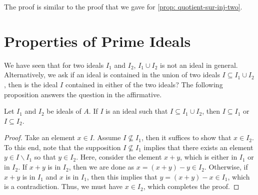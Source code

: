 The proof is similar to the proof that we gave for \eqref{prop: quotient-sur-inj-two}. 

\section{Properties of Prime Ideals}
We have seen that for two ideals $I_{1}$ and $I_{2}$, $I_{1} \cup I_{2}$ is not an ideal in general. Alternatively, we ask if an ideal is contained in the union of two ideals $I \subseteq I_{1} \cup I_{2}$, then is the ideal $I$ contained in either of the two ideals? The following proposition answers the question in the affirmative.
\begin{proposition}\label{prop: contained-two-some}
    Let $I_1$ and $I_2$ be ideals of $A$. If $I$ is an ideal such that $I \subseteq I_1 \cup I_2$, then $I \subseteq I_1$ or $I \subseteq I_2$.
\end{proposition}
\begin{proof}
    Take an element $x \in I$. Assume $I \nsubseteq I_1$, then it suffices to show that $x \in I_2$. To this end, note that the supposition $I \nsubseteq I_1$ implies that there exists an element $y \in I \backslash I_1$ so that $y \in I_2$. Here, consider the element $x+y$, which is either in $I_1$ or in $I_2$. If $x+y$ is in $I_2$, then we are done as $x = (x+y) - y\in I_2$.  Otherwise, if $x+y$ is in $I_1$ and $x$ is in $I_1$, then this implies that $y=(x+y)-x \in I_1$, which is a contradiction. Thus, we must have $x \in I_2$, which completes the proof.
\end{proof}

